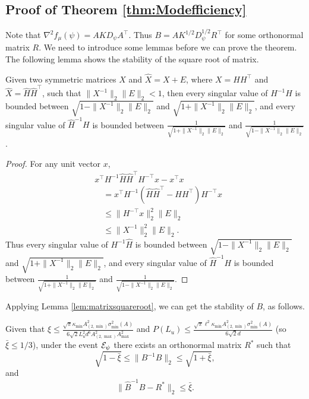 \subsection{Proof of Theorem \ref{thm:Modefficiency}}
\label{subsec:ProofModEff}
Note that $\nabla^2f_{\mu}(\psi) = AKD_{\psi}A^{\top}$. Thus $B = AK^{1/2}D_{\psi}^{1/2}R^{\top}$ for some orthonormal matrix $R$. 
We need to introduce some lemmas before we can prove the theorem. 
The following lemma shows the stability of the square root of matrix.
\begin{lemma}
\label{lem:matrixsquareroot}
Given two symmetric matrices $X$ and $\hat{X} = X + E$, where $X = HH^{\top}$ and $\hat{X} = \hat{H}\hat{H}^{\top}$, such that $\|X^{-1}\|_2 \|E\|_2 < 1$, then every singular value of $H^{-1}\hat{H}$ is bounded between $\sqrt{1- \|X^{-1}\|_2 \|E\|_2}$ and $\sqrt{1+ \|X^{-1}\|_2 \|E\|_2}$, 
and every singular value of $\hat{H}^{-1}H$ is bounded between $\frac{1}{\sqrt{1 + \|X^{-1}\|_2 \|E\|_2}}$ and $\frac{1}{\sqrt{1 - \|X^{-1}\|_2 \|E\|_2}}$. 
\end{lemma}
\begin{proof}
For any unit vector $x$,
\begin{align*}
& x^{\top}H^{-1}\hat{H}\hat{H}^{\top}H^{-\top}x - x^{\top}x\\
& \quad = x^{\top}H^{-1}\left( \hat{H}\hat{H}^{\top} - HH^{\top}\right)H^{-\top}x \\
& \quad \le \|H^{-\top}x\|^2_2 \|E\|_2 \\
& \quad \le \|X^{-1}\|_2^2 \|E\|_2.
\end{align*}
Thus every singular value of $H^{-1}\hat{H}$ is bounded between $\sqrt{1- \|X^{-1}\|_2 \|E\|_2}$ and $\sqrt{1+ \|X^{-1}\|_2 \|E\|_2}$, 
and every singular value of $\hat{H}^{-1}H$ is bounded between $\frac{1}{\sqrt{1 + \|X^{-1}\|_2 \|E\|_2}}$ and $\frac{1}{\sqrt{1 - \|X^{-1}\|_2 \|E\|_2}}$.
\end{proof}
Applying Lemma \ref{lem:matrixsquareroot}, we can get the stability of $B$, as follows.
\begin{lemma}
\label{lem:BhatinverseB}
Given that $\xi \le \frac{\sqrt{\pi}\kappa_{\min}A^2_{(2,\min)}\sigma_{\min}^2(A)}{6\sqrt{2}L_u^2d^6A_{(2,\max)}^2A_{\max}^2}$ and $P(L_u)\le \frac{\sqrt{\pi}\ell^2\kappa_{\min}A^2_{(2,\min)}\sigma_{\min}^2(A)}{6\sqrt{2}d}$
(so $\bar{\xi} \le 1/3$), under the event $\mathcal{E}_{\psi}$ there exists an orthonormal matrix $R^*$ such that 
 \[
 \sqrt{1-\bar{\xi}} \le \|B^{-1}\hat{B}\|_2 \le \sqrt{1+\bar{\xi}},
 \]
 and
\[
\|\hat{B}^{-1}B - R^*\|_2 \le \bar{\xi}.
\]
\end{lemma}
